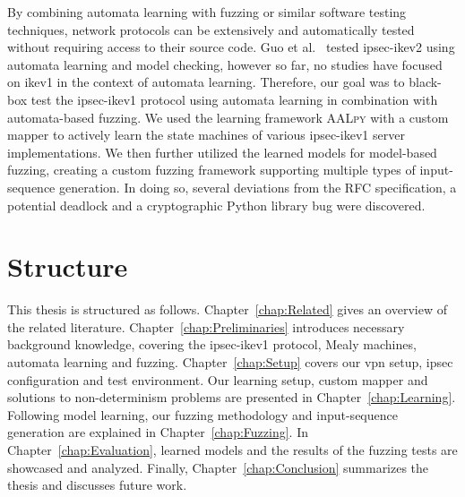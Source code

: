 By combining automata learning with fuzzing or similar software testing techniques, network protocols can be extensively and automatically tested without requiring access to their source code. Guo et al.~\cite{guo2019model} tested \ac{ipsec}-\ac{ike}v2 using automata learning and model checking, however so far, no studies have focused on \ac{ike}v1 in the context of automata learning. Therefore, our goal was to black-box test the \ac{ipsec}-\ac{ike}v1 protocol using automata learning in combination with automata-based fuzzing. We used the learning framework \textsc{AALpy} \cite{muvskardin2022aalpy} with a custom mapper to actively learn the state machines of various \ac{ipsec}-\ac{ike}v1 server implementations. We then further utilized the learned models for model-based fuzzing, creating a custom fuzzing framework supporting multiple types of input-sequence generation. In doing so, several deviations from the RFC specification, a potential deadlock and a cryptographic Python library bug were discovered.

\section{Structure}
This thesis is structured as follows. Chapter~\ref{chap:Related} gives an overview of the related literature. Chapter~\ref{chap:Preliminaries} introduces necessary background knowledge, covering the \ac{ipsec}-\ac{ike}v1 protocol, Mealy machines, automata learning and fuzzing. Chapter~\ref{chap:Setup} covers our \ac{vpn} setup, \ac{ipsec} configuration and test environment. Our learning setup, custom mapper and solutions to non-determinism problems are presented in Chapter~\ref{chap:Learning}. Following model learning, our fuzzing methodology and input-sequence generation are explained in Chapter~\ref{chap:Fuzzing}. In Chapter~\ref{chap:Evaluation}, learned models and the results of the fuzzing tests are showcased and analyzed.
Finally, Chapter~\ref{chap:Conclusion} summarizes the thesis and discusses future work.
